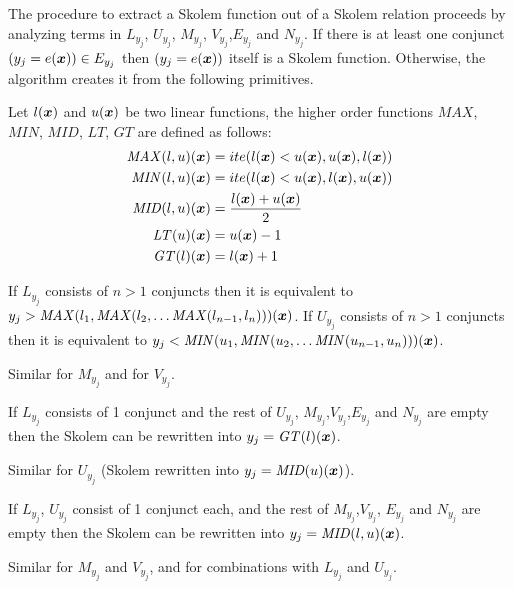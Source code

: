 The procedure to extract a Skolem function out of a Skolem relation proceeds by analyzing terms in $L_{y_j}$, $U_{y_j}$, $M_{y_j}$, $V_{y_j}$,$E_{y_j}$ and $N_{y_j}$.
If there is at least one conjunct $(y_j = e(\vx)) \in E_{y_j}$ then $(y_j = e(\vx))$ itself is a Skolem function.
Otherwise, the algorithm creates it from the following primitives.

\begin{definition}
Let $l(\vx)$ and $u(\vx)$ be two linear functions,
the higher order functions $\mathit{MAX}$, $\mathit{MIN}$, $\mathit{MID}$, $\mathit{LT}$, $\mathit{GT}$ are defined as follows:
\begin{align}
\mathit{MAX}(l, u) (\vx) &= ite (l (\vx) < u (\vx), u(\vx), l(\vx)) \notag \\
\mathit{MIN}(l, u) (\vx) &= ite (l (\vx) < u (\vx), l(\vx), u(\vx)) \notag \\
\mathit{MID}(l, u) (\vx) &= \frac{l(\vx) + u(\vx)}{ 2} \notag \\
\mathit{LT} (u) (\vx) &= u (\vx) -1 \notag \\
\mathit{GT} (l) (\vx) &= l (\vx) + 1 \notag 
\end{align}
\end{definition}

\begin{lemma}
If $L_{y_j}$ consists of $n>1$ conjuncts then it is equivalent to $y_j > \mathit{MAX} (l_1, \mathit{MAX} (l_2,\ldots \mathit{MAX} (l_{n-1}, l_n) )) (\vx)$.
If $U_{y_j}$ consists of $n>1$ conjuncts then it is equivalent to $y_j < \mathit{MIN} (u_1, \mathit{MIN} (u_2,\ldots \mathit{MIN} (u_{n-1}, u_n) ))(\vx)$.
\end{lemma}
Similar for $M_{y_j}$ and for $V_{y_j}$.

\begin{lemma}
If $L_{y_j}$ consists of 1 conjunct and the rest of $U_{y_j}$, $M_{y_j} $,$V_{y_j}$,$E_{y_j}$ and $N_{y_j}$ are empty then the Skolem can be rewritten into $y_j = \mathit{GT} (l)(\vx)$.
\end{lemma}
Similar for $U_{y_j}$ (Skolem  rewritten into $y_j = \mathit{MID} (u)(\vx)$).

\begin{lemma}
If $L_{y_j}$, $U_{y_j}$  consist of 1 conjunct each, and the rest of $M_{y_j} $,$V_{y_j}$, $E_{y_j}$ and $N_{y_j}$ are empty then the Skolem can be rewritten into $y_j = \mathit{MID} (l, u)(\vx)$. 
\end{lemma}
Similar for $M_{y_j}$ and $V_{y_j}$, and for combinations with $L_{y_j}$ and $U_{y_j}$.


